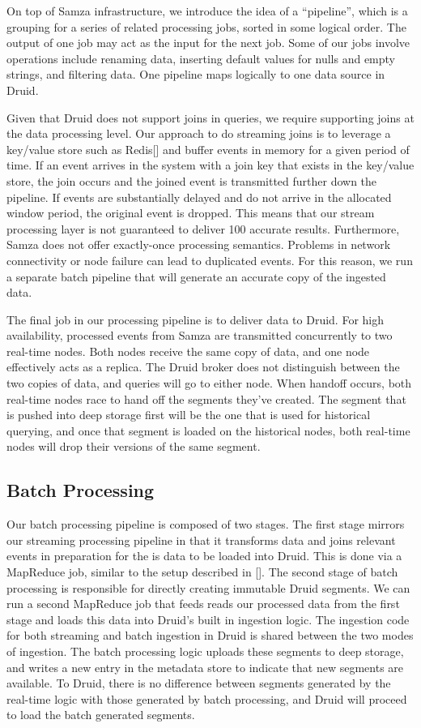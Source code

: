 \documentclass{vldb}
\begin{document}
On top of Samza infrastructure, we introduce the idea of a “pipeline”, which is
a grouping for a series of related processing jobs, sorted in some logical
order. The output of one job may act as the input for the next job. Some of our
jobs involve operations include renaming data, inserting default values for
nulls and empty strings, and filtering data. One pipeline maps logically to one
data source in Druid.

Given that Druid does not support joins in queries, we require supporting joins
at the data processing level. Our approach to do streaming joins is to leverage
a key/value store such as Redis[] and buffer events in memory for a given
period of time. If an event arrives in the system with a join key that exists
in the key/value store, the join occurs and the joined event is transmitted
further down the pipeline. If events are substantially delayed and do not
arrive in the allocated window period, the original event is dropped. This
means that our stream processing layer is not guaranteed to deliver 100%
accurate results. Furthermore, Samza does not offer exactly-once processing
semantics. Problems in network connectivity or node failure can lead to
duplicated events. For this reason, we run a separate batch pipeline that will
generate an accurate copy of the ingested data.

The final job in our processing pipeline is to deliver data to Druid. For high
availability, processed events from Samza are transmitted concurrently to two
real-time nodes. Both nodes receive the same copy of data, and one node
effectively acts as a replica. The Druid broker does not distinguish between
the two copies of data, and queries will go to either node. When handoff
occurs, both real-time nodes race to hand off the segments they’ve created. The
segment that is pushed into deep storage first will be the one that is used for
historical querying, and once that segment is loaded on the historical nodes,
both real-time nodes will drop their versions of the same segment.

\subsection{Batch Processing}
Our batch processing pipeline is composed of two stages. The first stage
mirrors our streaming processing pipeline in that it transforms data and joins
relevant events in preparation for the is data to be loaded into Druid. This is
done via a MapReduce job, similar to the setup described in []. The second
stage of batch processing is responsible for directly creating immutable Druid
segments. We can run a second MapReduce\cite{dean2008mapreduce} job that feeds reads our processed
data from the first stage and loads this data into Druid’s built in ingestion
logic. The ingestion code for both streaming and batch ingestion in Druid is
shared between the two modes of ingestion. The batch processing logic uploads
these segments to deep storage, and writes a new entry in the metadata store to
indicate that new segments are available. To Druid, there is no difference
between segments generated by the real-time logic with those generated by batch
processing, and Druid will proceed to load the batch generated segments.
\end{document}
